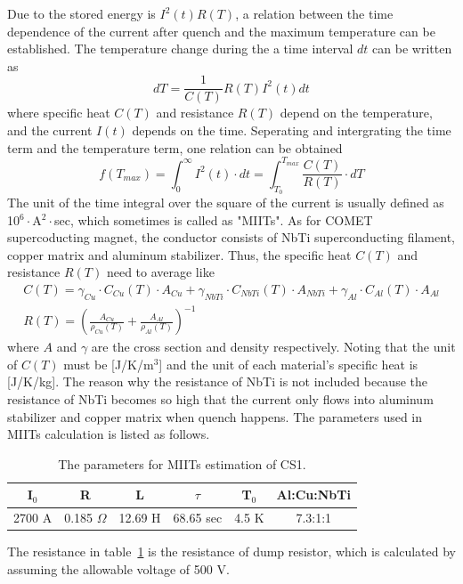 Due to the stored energy is $I^2(t)R(T)$, a relation between the time dependence of the current after quench and the maximum temperature can be established.
The temperature change during the a time interval $dt$ can be written as
\begin{equation}
 dT = \frac{1}{C(T)} R(T) I^2(t) dt
\end{equation}
where specific heat $C(T)$ and resistance $R(T)$ depend on the temperature, and the current $I(t)$ depends on the time.
Seperating and intergrating the time term and the temperature term, one relation can be obtained
\begin{equation}
 f(T_{max}) = \int^{\infty}_0 I^2(t) \cdot dt = \int^{T_{max}}_{T_0} \frac{C(T)}{R(T)} \cdot dT
\end{equation}
The unit of the time integral over the square of the current is usually defined as 10$^6\cdot$A$^2\cdot$sec, which sometimes is called as "MIITs".
As for COMET supercoducting magnet, the conductor consists of NbTi superconducting filament, copper matrix and aluminum stabilizer.
Thus, the specific heat $C(T)$ and resistance $R(T)$ need to average like
\begin{gather}
 C(T) = \gamma_{Cu} \cdot C_{Cu}(T) \cdot A_{Cu} + \gamma_{NbTi} \cdot C_{NbTi}(T) \cdot A_{NbTi} + \gamma_{Al} \cdot C_{Al}(T) \cdot A_{Al} \\
 R(T) = (\frac{A_{Cu}}{\rho_{Cu}(T)} + \frac{A_{Al}}{\rho_{Al}(T)})^{-1}
\end{gather}
where $A$ and $\gamma$ are the cross section and density respectively.
Noting that the unit of $C(T)$ must be [J/K/m$^3$] and the unit of each material's specific heat is [J/K/kg].
The reason why the resistance of NbTi is not included because the resistance of NbTi becomes so high that the current only flows into aluminum stabilizer and copper matrix when quench happens.
The parameters used in MIITs calculation is listed as follows.
\begin{table}[H]
 \centering
 \begin{tabular}{cccccc} \hline \hline
  I$_0$ & R & L & $\tau$ & T$_0$ & Al:Cu:NbTi \\ \hline
  2700 A & 0.185 $\Omega$ & 12.69 H & 68.65 sec & 4.5 K & 7.3:1:1 \\ \hline \hline
 \end{tabular}
 \caption{The parameters for MIITs estimation of CS1.}
 \label{miitspara}
\end{table}
The resistance in table~\ref{miitspara} is the resistance of dump resistor, which is calculated by assuming the allowable voltage of 500 V.
